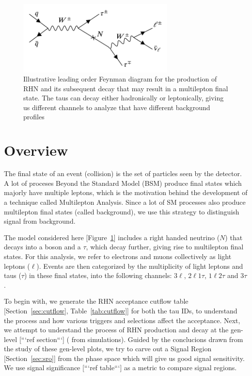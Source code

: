 \documentclass[letterpaper,12pt]{article}
\begin{document}
\begin{figure}[h!]
  \includegraphics[width=0.7\textwidth, center]{RHNfeynman.png}
  \caption{Illustrative leading order Feynman diagram for the production of RHN and its subsequent decay that may result in a multilepton final state. The taus can decay either hadronically or leptonically, giving us different channels to analyze that have different background profiles}
  \label{fig:rhnfeyn}
\end{figure}

\section{Overview}
\label{sec:overview}

The final state of an event (collision) is the set of particles seen by the detector. A lot of proceses Beyond the Standard Model (BSM) produce final states which majorly have multiple leptons, which is the motivation behind the development of a technique called Multilepton Analysis. Since a lot of SM processes also produce multilepton final states (called background), we use this strategy to distinguish signal from background.

The model considered here [Figure~\ref{fig:rhnfeyn}] includes a right handed neutrino ($N$) that decays into a \Wboson{} boson and a $\tau$, which decay further, giving rise to multilepton final states. For this analysis, we refer to electrons and muons collectively as light leptons ($\ell$). Events are then categorized by the multiplicity of light leptons and taus ($\tau$) in these final states, into the following channels: $3\ell$, $2\ell1\tau$, $1\ell2\tau$ and $3\tau$.

To begin with, we generate the RHN acceptance cutflow table [Section~\ref{sec:cutflow}, Table~\ref{tab:cutflow}] for both the tau IDs, to understand the process and how various triggers and selections affect the acceptance. Next, we attempt to understand the process of RHN production and decay at the gen-level [```ref section```] (\ie{} from simulations). Guided by the conclucions drawn from the study of these gen-level plots, we try to carve out a Signal Region [Section~\ref{sec:sro}] from the phase space which will give us good signal sensitivity. We use signal significance [```ref table```] as a metric to compare signal regions.   
\end{document}
